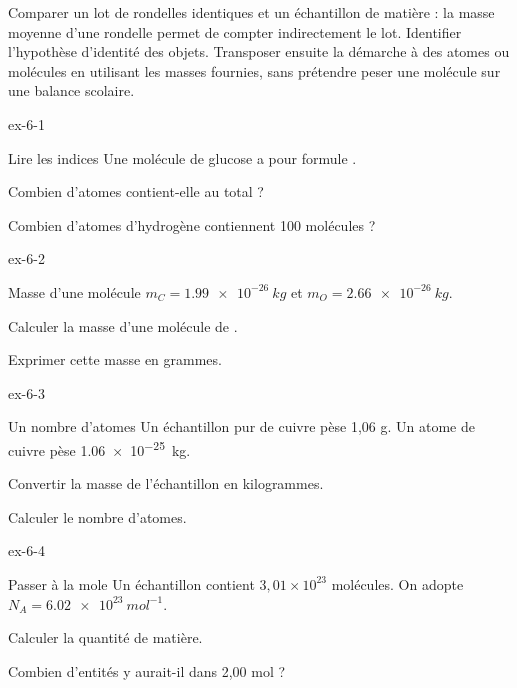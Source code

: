 \begin{experience}Comparer un lot de rondelles identiques et un échantillon de matière : la masse moyenne d'une rondelle permet de compter indirectement le lot. Identifier l'hypothèse d'identité des objets. Transposer ensuite la démarche à des atomes ou molécules en utilisant les masses fournies, sans prétendre peser une molécule sur une balance scolaire.\end{experience}
\exercices
{}
\begin{blocLivre}{ex-6-1}\begin{exercice}[1]{Lire les indices}
Une molécule de glucose a pour formule .
\begin{questions}
\item Combien d’atomes contient-elle au total ?
\item Combien d’atomes d’hydrogène contiennent 100 molécules ?
\end{questions}
\end{exercice}\end{blocLivre}
\begin{blocLivre}{ex-6-2}\begin{exercice}[1]{Masse d’une molécule}
$m_C=\qty{1,99e-26}{kg}$ et $m_O=\qty{2,66e-26}{kg}$.
\begin{questions}
\item Calculer la masse d’une molécule de .
\item Exprimer cette masse en grammes.
\end{questions}
\end{exercice}\end{blocLivre}
\begin{blocLivre}{ex-6-3}\begin{exercice}[1]{Un nombre d’atomes}
Un échantillon pur de cuivre pèse 1,06 g. Un atome de cuivre pèse \qty{1,06e-25}{kg}.
\begin{questions}
\item Convertir la masse de l’échantillon en kilogrammes.
\item Calculer le nombre d’atomes.
\end{questions}
\end{exercice}\end{blocLivre}
\begin{blocLivre}{ex-6-4}\begin{exercice}[1]{Passer à la mole}
Un échantillon contient $3,01\times10^{23}$ molécules. On adopte $N_A=\qty{6,02e23}{mol^{-1}}$.
\begin{questions}
\item Calculer la quantité de matière.
\item Combien d’entités y aurait-il dans 2,00 mol ?
\end{questions}
\end{exercice}\end{blocLivre}
